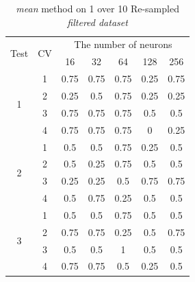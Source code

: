 \documentclass[draft,dvipsnames]{drexel-thesis}
\begin{document}
\begin{thesis}
\begin{table}[!t]
\centering
\caption{{\em mean} method on 1 over 10 Re-sampled {\em filtered dataset}}
\label{tbl:mean_1_10}
\begin{tabular}{|c|c|c|c|c|c|c|}
\hline
\multirow{2}{*}{Test} & \multirow{2}{*}{CV} & \multicolumn{5}{c|}{The number of neurons}                               \\ \cline{3-7}
                      &                     & 16           & 32           & 64           & 128          & 256          \\ \hline
\multirow{4}{*}{1}    & 1                   & 0.75         & 0.75         & 0.75         & 0.25         & 0.75         \\ \cline{2-7}
                      & 2                   & 0.25         & 0.5          & 0.75         & 0.25         & 0.25         \\ \cline{2-7}
                      & 3                   & 0.75         & 0.75         & 0.75         & 0.5          & 0.5          \\ \cline{2-7}
                      & 4                   & 0.75         & 0.75         & 0.75         & 0            & 0.25         \\ \hline
\multirow{4}{*}{2}    & 1                   & 0.5          & 0.5          & 0.75         & 0.25         & 0.5          \\ \cline{2-7}
                      & 2                   & 0.5          & 0.25         & 0.75         & 0.5          & 0.5          \\ \cline{2-7}
                      & 3                   & 0.25         & 0.25         & 0.5          & 0.75         & 0.75         \\ \cline{2-7}
                      & 4                   & 0.5          & 0.75         & 0.25         & 0.5          & 0.5          \\ \hline
\multirow{4}{*}{3}    & 1                   & 0.5          & 0.5          & 0.75         & 0.5          & 0.5          \\ \cline{2-7}
                      & 2                   & 0.75         & 0.75         & 0.25         & 0.5          & 0.75         \\ \cline{2-7}
                      & 3                   & 0.5          & 0.5          & 1            & 0.5          & 0.5          \\ \cline{2-7}
                      & 4                   & 0.75         & 0.75         & 0.5          & 0.25         & 0.5          \\ \hline

\end{tabular}
\end{table}
\end{thesis}
\end{document}
